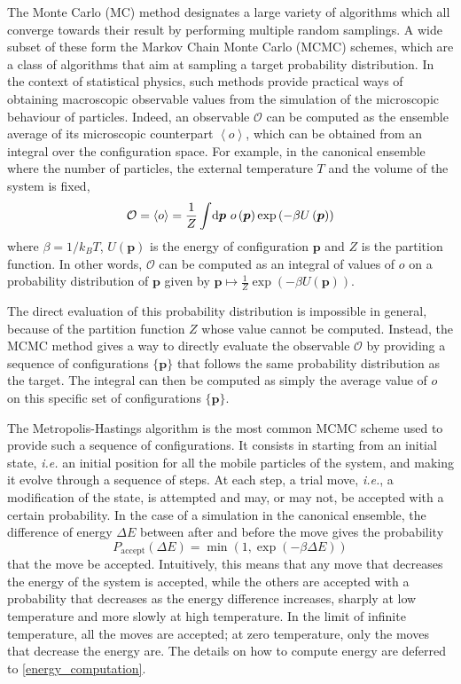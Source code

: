 \documentclass[main.tex]{subfiles}
\begin{document}
The Monte Carlo (MC) method designates a large variety of algorithms which all converge towards their result by performing multiple random samplings. A wide subset of these form the Markov Chain Monte Carlo (MCMC) schemes, which are a class of algorithms that aim at sampling a target probability distribution. In the context of statistical physics, such methods provide practical ways of obtaining macroscopic observable values from the simulation of the microscopic behaviour of particles. Indeed, an observable $\mathcal O$ can be computed as the ensemble average of its microscopic counterpart $\left<o\right>$, which can be obtained from an integral over the configuration space. For example, in the canonical ensemble where the number of particles, the external temperature $T$ and the volume of the system is fixed, \[\mathcal O = \left<o\right> = \frac1Z\int\!\text d{\boldsymbol p}\  o\left({\boldsymbol p}\right)\exp\left(-\beta U\left({\boldsymbol p}\right)\right)\label{eq:canonicalensemble}\] where $\beta = 1/k_BT$, $U\left({\boldsymbol p}\right)$ is the energy of configuration $\boldsymbol p$ and $Z$ is the partition function. In other words, $\mathcal O$ can be computed as an integral of values of $o$ on a probability distribution of $\boldsymbol p$ given by $\boldsymbol p\mapsto \frac1Z\exp\left(-\beta U\left({\boldsymbol p}\right)\right)$.

The direct evaluation of this probability distribution is impossible in general, because of the partition function $Z$ whose value cannot be computed. Instead, the MCMC method gives a way to directly evaluate the observable $\mathcal O$ by providing a sequence of configurations $\{\boldsymbol p\}$ that follows the same probability distribution as the target. The integral can then be computed as simply the average value of $o$ on this specific set of configurations $\{\boldsymbol p\}$.

\label{metropolis}

The Metropolis-Hastings algorithm is the most common MCMC scheme used to provide such a sequence of configurations. It consists in starting from an initial state, \textit{i.e.} an initial position for all the mobile particles of the system, and making it evolve through a sequence of steps. At each step, a trial move, \textit{i.e.}, a modification of the state, is attempted and may, or may not, be accepted with a certain probability. In the case of a simulation in the canonical ensemble, the difference of energy $\Delta E$ between after and before the move gives the probability
\[P_\text{accept}(\Delta E) = \min\left(1, \exp\left(-\beta \Delta E\right)\right)\label{eq:MCcanonicalaccept}\]
that the move be accepted. Intuitively, this means that any move that decreases the energy of the system is accepted, while the others are accepted with a probability that decreases as the energy difference increases, sharply at low temperature and more slowly at high temperature. In the limit of infinite temperature, all the moves are accepted; at zero temperature, only the moves that decrease the energy are. The details on how to compute energy are deferred to \cref{energy_computation}.
\end{document}
